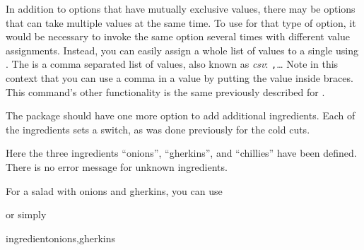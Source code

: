 \begin{Declaration}
\end{Declaration}
In addition to options that have mutually exclusive values, there may be
options that can take multiple values at the same time. To use
 for that type of option, it would be
necessary to invoke the same option several times with different value
assignments. Instead, you can easily assign a whole list of values to a single
 using . The  is a comma
separated list of values, also known as \emph{csv}:
    \texttt{,}\dots
Note in this context that you can use a comma in a value by putting the value
inside braces. This command's other functionality is the same previously
described for .
\begin{Example}
  The  package should have one more option to add
  additional ingredients. Each of the ingredients sets a switch, as was done
  previously for the cold cuts.
\begin{lstcode}
  \newif\if@saladwith@onions
  \newif\if@saladwith@gherkins
  \newif\if@saladwith@chillies
\end{lstcode}
  Here the three ingredients ``onions'', ``gherkins'', and ``chillies'' have
  been defined. There is no error message for unknown ingredients.

  For a salad with onions and gherkins, you can use
\begin{lstcode}
\end{lstcode}
  or simply
\begin{lstcode}
               {ingredient}{onions,gherkins}
\end{lstcode}
\end{Example}
%
\EndIndexGroup


